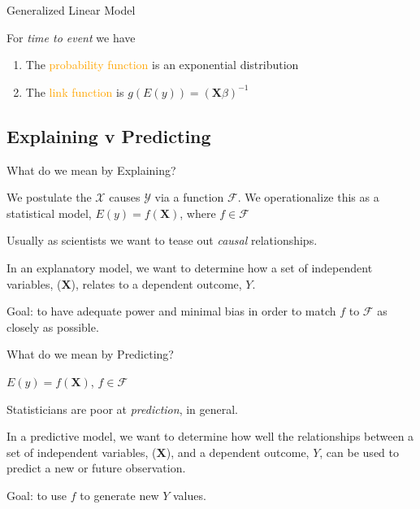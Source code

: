 \documentclass[
  12pt,
  ignorenonframetext,
]{beamer}
\providecommand{\tightlist}{%
  \setlength{\itemsep}{0pt}\setlength{\parskip}{0pt}}
\begin{document}
\begin{frame}{Generalized Linear Model}
\protect\hypertarget{generalized-linear-model-4}{}

For \emph{time to event} we have

\begin{enumerate}[<+->]
\tightlist
\item
  The \textcolor{orange}{probability function} is an exponential
  distribution
\item
  The \textcolor{orange}{link function} is
  \(g(E(y))={(\boldsymbol{X}\beta)}^{-1}\)
\end{enumerate}

\end{frame}

\hypertarget{explaining-v-predicting}{%
\subsection{Explaining v Predicting}\label{explaining-v-predicting}}

\begin{frame}{What do we mean by Explaining?}
\protect\hypertarget{what-do-we-mean-by-explaining}{}

We postulate the \(\mathcal{X}\) causes \(\mathcal{Y}\) via a function
\(\mathcal{F}\). We operationalize this as a statistical model,
\(E(y)=f(\boldsymbol{X})\), where \(f\in\mathcal{F}\)

Usually as scientists we want to tease out \emph{causal} relationships.

In an explanatory model, we want to determine how a set of independent
variables, (\(\boldsymbol{X}\)), relates to a dependent outcome, \(Y\).

Goal: to have adequate power and minimal bias in order to match \(f\) to
\(\mathcal{F}\) as closely as possible.

\end{frame}

\begin{frame}{What do we mean by Predicting?}
\protect\hypertarget{what-do-we-mean-by-predicting}{}

\(E(y)=f(\boldsymbol{X})\), \(f\in\mathcal{F}\)

Statisticians are poor at \emph{prediction}, in general.

In a predictive model, we want to determine how well the relationships
between a set of independent variables, (\(\boldsymbol{X}\)), and a
dependent outcome, \(Y\), can be used to predict a new or future
observation.

Goal: to use \(f\) to generate new \(Y\) values.

\end{frame}
\end{document}
